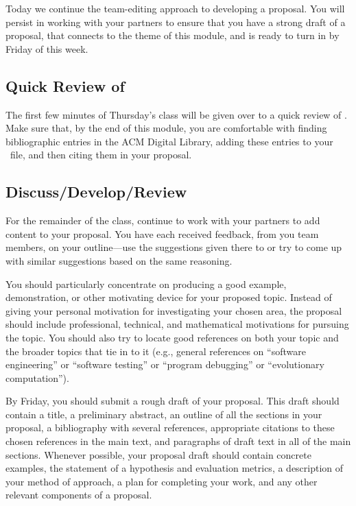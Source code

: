
\usepackage{ulem}
\usepackage[compact]{titlesec}




Today we continue the team-editing approach to developing a proposal.  You will persist in working with your partners to
ensure that you have a strong draft of a proposal, that connects to the theme of this module, and is ready to turn in by
Friday of this week.

\subsection*{Quick Review of \BibTeX}

The first few minutes of Thursday's class will be given over to a quick review of \BibTeX. Make sure that, by the end of
this module, you are comfortable with finding bibliographic entries in the ACM Digital Library, adding these entries to
your \BibTeX\ file, and then citing them in your proposal.

\subsection*{Discuss/Develop/Review}

For the remainder of the class, continue to work with your partners to add content to your proposal. You have each
received feedback, from you team members, on your outline---use the suggestions given there to or try to come up with
similar suggestions based on the same reasoning.

You should particularly concentrate on producing a good example, demonstration, or other motivating device for your
proposed topic. Instead of giving your personal motivation for investigating your chosen area, the proposal should
include professional, technical, and mathematical motivations for pursuing the topic.  You should also try to locate
good references on both your topic and the broader topics that tie in to it (e.g., general references on ``software
engineering'' or ``software testing'' or ``program debugging'' or ``evolutionary computation'').

By Friday, you should submit a rough draft of your proposal. This draft should contain a title, a preliminary abstract,
an outline of all the sections in your proposal, a bibliography with several references, appropriate citations to these
chosen references in the main text, and paragraphs of draft text in all of the main sections. Whenever possible, your
proposal draft should contain concrete examples, the statement of a hypothesis and evaluation metrics, a description of
your method of approach, a plan for completing your work, and any other relevant components of a proposal.


